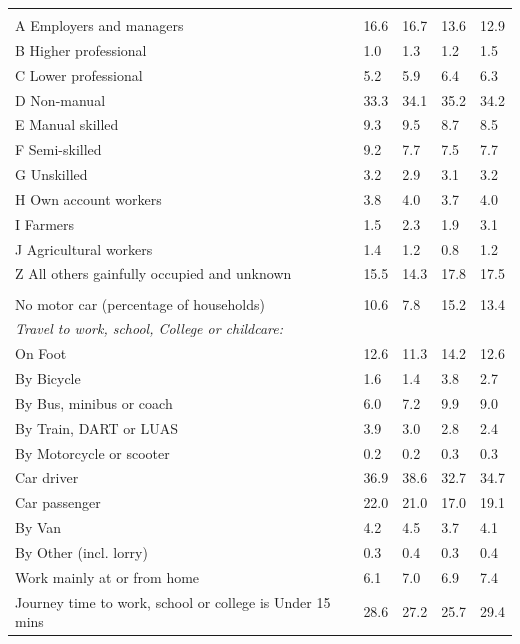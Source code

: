 \documentclass{article}
\begin{document}
\begin{table}[h]
\begin{tabular}{KTTTT}
\hline
    \\ 
    \hline
A Employers and managers & 16.6& 16.7& 13.6& 12.9\\
B Higher professional & 1.0& 1.3& 1.2& 1.5\\
C Lower professional & 5.2& 5.9& 6.4& 6.3\\
D Non-manual & 33.3& 34.1& 35.2& 34.2\\
E Manual skilled & 9.3& 9.5& 8.7& 8.5\\
F Semi-skilled & 9.2& 7.7& 7.5& 7.7\\
G Unskilled & 3.2& 2.9& 3.1& 3.2\\
H Own account workers & 3.8& 4.0& 3.7& 4.0\\
I Farmers & 1.5& 2.3& 1.9& 3.1\\
J Agricultural workers & 1.4& 1.2& 0.8& 1.2\\
Z All others gainfully occupied and unknown & 15.5& 14.3& 17.8& 17.5\\
\hline
{}\hline
    \\ 
    \hline
No motor car (percentage of households) & 10.6&  7.8& 15.2& 
13.4\\
    \hline 
\emph{Travel to work, school, College or childcare:} & & & \\
\quad On Foot & 12.6& 11.3& 14.2& 12.6\\ 
\quad By Bicycle & 1.6& 1.4& 3.8& 2.7\\ 
\quad By Bus, minibus or coach & 6.0& 7.2& 9.9& 9.0\\
\quad By Train, DART or LUAS & 3.9& 3.0& 2.8& 2.4\\
\quad By Motorcycle or scooter & 0.2& 0.2& 0.3& 0.3\\
\quad Car driver & 36.9 & 38.6& 32.7& 34.7\\
\quad Car passenger & 22.0& 21.0& 17.0& 19.1\\
\quad By Van & 4.2& 4.5& 3.7& 4.1\\
\quad By Other (incl. lorry) & 0.3& 0.4& 0.3& 0.4\\
    \hline
Work mainly at or from home & 6.1& 7.0& 6.9& 7.4\\
Journey time to work, school or college is Under 15 mins & 28.6& 27.2& 25.7& 29.4\\

\end{tabular}
\end{table}
\end{document}
